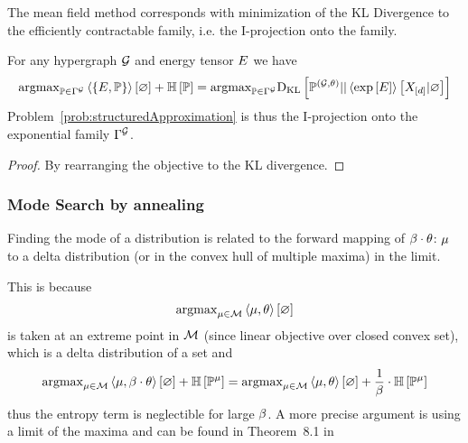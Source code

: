 The mean field method corresponds with minimization of the KL Divergence to the efficiently contractable family, i.e. the I-projection onto the family.

\begin{theorem}
	For any hypergraph $\mathcal{G}$ and energy tensor $E$ we have 
	\begin{align*}
		\mathrm{argmax}_{\mathbb{P}\in \Gamma^{\mathcal{G}}} \left\langle \{E, \mathbb{P}\}\right\rangle \left[ \varnothing \right] + \mathbb{H}\left[\mathbb{P}\right]
		= \mathrm{argmax}_{\mathbb{P}\in \Gamma^{\mathcal{G}}} \mathrm{D}_{\mathrm{KL}}\left[ \mathbb{P}^{(\mathcal{G},\theta)} || \left\langle \mathrm{exp}\left[E\right]\right\rangle \left[ X_{[d]} | \varnothing \right] \right]
	\end{align*}
	Problem~\ref{prob:structuredApproximation} is thus the I-projection onto the exponential family $\Gamma^{\mathcal{G}}$.
\end{theorem}
\begin{proof}
	By rearranging the objective to the KL divergence.
\end{proof}


\subsubsection{Mode Search by annealing}

Finding the mode of a distribution is related to the forward mapping of $\beta\cdot\theta$: $\mu$ to a delta distribution (or in the convex hull of multiple maxima) in the limit.

This is because 
\begin{align*}
	\mathrm{argmax}_{\mu\in\mathcal{M}}  \left\langle \mu,\theta\right\rangle \left[ \varnothing \right] 
\end{align*}
is taken at an extreme point in $\mathcal{M}$ (since linear objective over closed convex set), which is a delta distribution of a set and
\begin{align*}
	\mathrm{argmax}_{\mu\in\mathcal{M}}  \left\langle \mu,\beta\cdot\theta\right\rangle \left[ \varnothing \right] + \mathbb{H}\left[\mathbb{P}^{\mu}\right] 
	= 
	\mathrm{argmax}_{\mu\in\mathcal{M}}  \left\langle \mu,\theta\right\rangle \left[ \varnothing \right] + \frac{1}{\beta} \cdot \mathbb{H}\left[\mathbb{P}^{\mu}\right] 	
\end{align*}
thus the entropy term is neglectible for large $\beta$.
A more precise argument is using a limit of the maxima and can be found in Theorem~8.1 in \cite{wainwright_graphical_2008}





